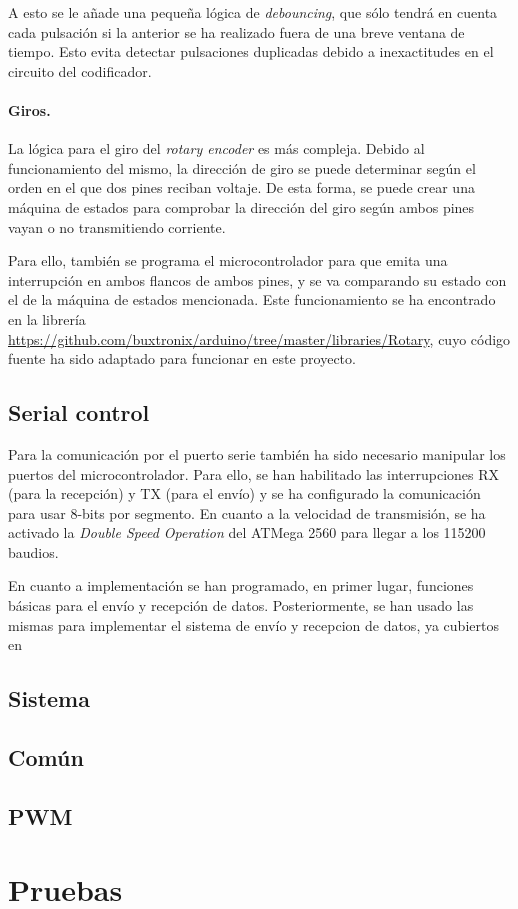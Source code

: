 A esto se le añade una pequeña lógica de \textit{debouncing}, que sólo tendrá en cuenta cada pulsación si la anterior se ha realizado fuera de una breve ventana de tiempo. Esto evita detectar pulsaciones duplicadas debido a inexactitudes en el circuito del codificador.

\paragraph{Giros.} La lógica para el giro del \textit{rotary encoder} es más compleja. Debido al funcionamiento del mismo, la dirección de giro se puede determinar según el orden en el que dos pines reciban voltaje. De esta forma, se puede crear una máquina de estados para comprobar la dirección del giro según ambos pines vayan o no transmitiendo corriente.

Para ello, también se programa el microcontrolador para que emita una interrupción en ambos flancos de ambos pines, y se va comparando su estado con el de la máquina de estados mencionada. Este funcionamiento se ha encontrado en la librería \url{https://github.com/buxtronix/arduino/tree/master/libraries/Rotary}, cuyo código fuente ha sido adaptado para funcionar en este proyecto.


\subsection{Serial control}

Para la comunicación por el puerto serie también ha sido necesario manipular los puertos del microcontrolador. Para ello, se han habilitado las interrupciones RX (para la recepción) y TX (para el envío) y se ha configurado la comunicación para usar 8-bits por segmento. En cuanto a la velocidad de transmisión, se ha activado la \textit{Double Speed Operation} del ATMega 2560 para llegar a los 115200 baudios.

En cuanto a implementación se han programado, en primer lugar, funciones básicas para el envío y recepción de datos. Posteriormente, se han usado las mismas para implementar el sistema de envío y recepcion de datos, ya cubiertos en %


\subsection{Sistema}
\subsection{Común}
\subsection{PWM}


\section{Pruebas}

